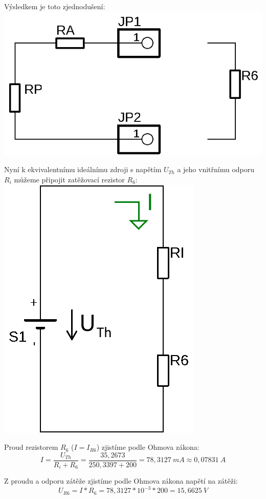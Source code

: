 Výsledkem je toto zjednodušení: \\

\includegraphics[totalheight=4cm]{fig/2_6.png}

Nyní k ekvivalentnímu ideálnímu zdroji s napětím $U_{Th}$ a jeho vnitřnímu odporu $R_i$ můžeme připojit zatěžovací rezistor $R_6$: \\

\includegraphics[totalheight=5cm]{fig/2_7.png} 

\newpage
Proud rezistorem $R_6$ ($I = I_{R6}$) zjistíme podle Ohmova zákona:
{\large$$I =\frac{U_{Th}}{R_i+R_6} = \frac{35,2673}{250,3397+200} = 78,3127\:mA\approx0,07831\:A$$}

Z proudu a odporu zátěže zjistíme podle Ohmova zákona napětí na zátěži:
{\large$$U_{R6} = I*R_6 = 78,3127 * 10^{-3} * 200 = 15,6625\:V$$}